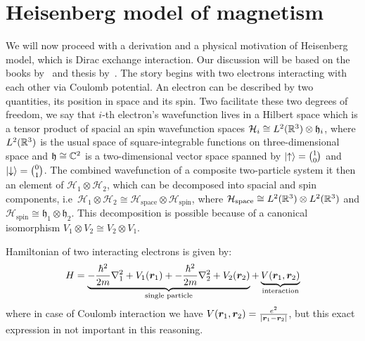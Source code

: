 \section{Heisenberg model of magnetism}
We will now proceed with a derivation and a physical motivation of Heisenberg model,
which is Dirac exchange interaction.
Our discussion will be based on the books by~\textcite{spalek2015,Korepin1993} and 
thesis by~\textcite{Ng2011HeisenbergM}.
The story begins with two electrons interacting with each other via Coulomb potential.
An electron can be described by two quantities, its position in space and its spin.
Two facilitate these two degrees of freedom, we say that \(i\)-th electron's wavefunction
lives in a Hilbert space which is a tensor product of spacial an spin 
wavefunction spaces \(\mathcal{H}_i \cong L^2(\mathbb{R}^3) \otimes \mathfrak{h}_i \), where
\(L^2(\mathbb{R}^3)\) is the usual space of square-integrable functions on three-dimensional space
and \(\mathfrak{h} \cong \mathbb{C}^2\) is a two-dimensional vector space spanned by
\(\ket{\uparrow} = \binom{1}{0} \) and \(\ket{\downarrow} = \binom{0}{1}\).
The combined wavefunction of a composite two-particle system it then an element of
\(\mathcal{H}_1 \otimes \mathcal{H}_2\), which can be decomposed into spacial and spin
components, i.e\ \(\mathcal{H}_1 \otimes \mathcal{H}_2 \cong\mathcal{H}_{\mathrm{space}} 
\otimes \mathcal{H}_{\mathrm{spin}}\), where \(\mathcal{H}_{\mathrm{space}} 
\cong L^2(\mathbb{R}^3) \otimes L^2(\mathbb{R}^3)\) and \(\mathcal{H}_{\mathrm{spin}} \cong
\mathfrak{h}_1 \otimes \mathfrak{h}_2\). This decomposition is possible because of 
a canonical isomorphism \(V_1 \otimes V_2 \cong V_2 \otimes V_1\). 

Hamiltonian of two interacting electrons is given by:
\begin{equation}
    H = \underbrace{-\frac{\hbar^2}{2m} \laplacian_1 + V_1(\bm{r}_1) + 
    -\frac{\hbar^2}{2m} \laplacian_2 + V_2(\bm{r}_2)}_{\textrm{single particle}}
     + \underbrace{V(\bm{r}_1,\bm{r}_2)}_{\textrm{interaction}}
\end{equation}
where in case of Coulomb interaction we have \(V(\bm{r}_1,\bm{r}_2)=\frac{e^2}
{\abs{\bm{r}_1-\bm{r}_2}}\), but this exact expression in not important in this reasoning.









